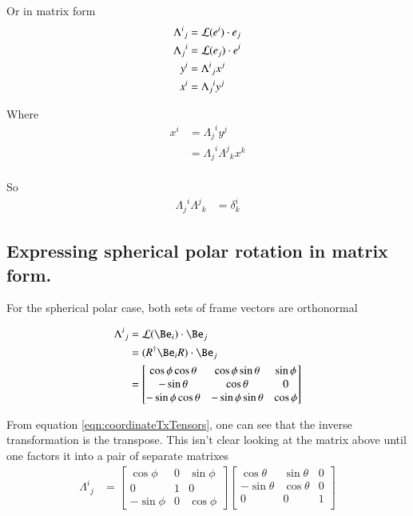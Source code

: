 \documentclass{article}
\begin{document}
Or in matrix form
\begin{align}\label{eqn:coordinateTxTensors}
{\Lambda^i}_j &= \mathcal{L}(e^i) \cdot e_j \\
{\Lambda_j}^i &= \mathcal{L}(e_j) \cdot e^i \\
y^i &= {\Lambda^i}_j x^j \\
x^i &= {\Lambda_j}^i y^j
\end{align}

Where
\begin{align*}
x^i &= {\Lambda_j}^i y^j \\
&= {\Lambda_j}^i {\Lambda^j}_k x^k \\
\end{align*}

So
\begin{align*}
{\Lambda_j}^i {\Lambda^j}_k &= \delta^i_k
\end{align*}

\subsection{ Expressing spherical polar rotation in matrix form. }

For the spherical polar case, both sets of frame vectors are orthonormal

\begin{align*}
{\Lambda^i}_j
&= \LL(\Be_i) \cdot \Be_j \\
&= (R^\dagger \Be_i R) \cdot \Be_j \\
&=
\begin{bmatrix}
\cos\phi \cos\theta & \cos\phi \sin\theta & \sin\phi \\
- \sin\theta & \cos\theta & 0 \\
- \sin\phi \cos\theta & - \sin\phi \sin\theta & \cos\phi \\
\end{bmatrix}
\end{align*}

From equation \ref{eqn:coordinateTxTensors}, one can see that the inverse transformation is the transpose.  This isn't clear looking at the matrix above until one factors it into a pair of separate matrixes
\begin{align*}
{\Lambda^i}_j
&=
\begin{bmatrix}
\cos\phi & 0 & \sin\phi \\
0 & 1 & 0 \\
-\sin\phi & 0 & \cos\phi
\end{bmatrix}
\begin{bmatrix}
\cos\theta & \sin\theta & 0 \\
-\sin\theta & \cos\theta & 0 \\
0 & 0 & 1 \\
\end{bmatrix}
\end{align*}
\end{document}
